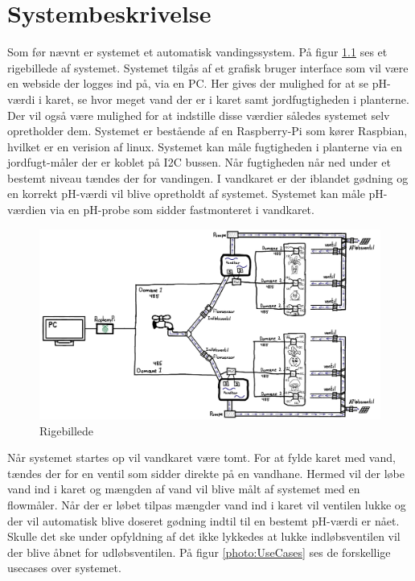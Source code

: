 \chapter{Systembeskrivelse}
Som før nævnt er systemet et automatisk vandingssystem. På figur \ref{photo:RigeBillede} ses et rigebillede af systemet. Systemet tilgås af et grafisk bruger interface som vil være en webside der logges ind på, via en PC. Her gives der mulighed for at se pH-værdi i karet, se hvor meget vand der er i karet samt jordfugtigheden i planterne. Der vil også være mulighed for at indstille disse værdier således systemet selv opretholder dem. Systemet er bestående af en  Raspberry-Pi som kører Raspbian, hvilket er en verision af linux. Systemet kan måle fugtigheden i planterne via en jordfugt-måler der er koblet på I2C bussen. Når fugtigheden når ned under et bestemt niveau tændes der for vandingen. I vandkaret er der iblandet gødning og en korrekt pH-værdi vil blive opretholdt af systemet. Systemet kan måle pH-værdien via en pH-probe som sidder fastmonteret i vandkaret.  
\begin{figure}[H]
	\centering
	\includegraphics[scale=0.45]{systembeskrivelse/rigebillede}
	\caption{Rigebillede}
	\label{photo:RigeBillede}
\end{figure}
Når systemet startes op vil vandkaret være tomt. For at fylde karet med vand, tændes der for en ventil som sidder direkte på en vandhane. Hermed vil der løbe vand ind i karet og mængden af vand vil blive målt af systemet med en flowmåler. Når der er løbet tilpas mængder vand ind i karet vil ventilen lukke og der vil automatisk blive doseret gødning indtil til en bestemt pH-værdi er nået. Skulle det ske under opfyldning af det ikke lykkedes at lukke indløbsventilen vil der blive åbnet for udløbsventilen. På figur \ref{photo:UseCases} ses de forskellige usecases over systemet.

